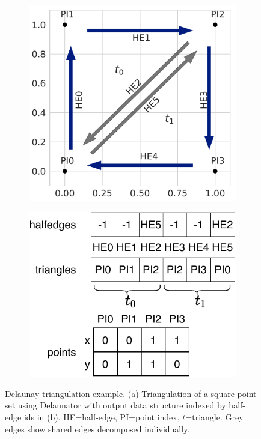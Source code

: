 \begin{figure}[ht]
    \centering
  \begin{subfigure}{.25\linewidth}
    \centering
    \includegraphics[width=0.99\linewidth]{chapter_2_polylidar/imgs/delaunator_tri-min.pdf}
    \caption{}
    \label{fig:ch2_delaunator_tri}
  \end{subfigure}
  \begin{subfigure}{.25\linewidth}
    \centering
    \includegraphics[width=.99\linewidth]{chapter_2_polylidar/imgs/DelaunatorDS.pdf}
    \caption{}
    \label{fig:ch2_delaunator_ds}
  \end{subfigure}
  \caption[Delaunay triangulation example]{Delaunay triangulation example. (a) Triangulation of a square point set using Delaunator \cite{noauthor_github_2018} with output data structure indexed by half-edge ids in (b).  HE=half-edge, PI=point index, $t$=triangle. Grey edges show shared edges decomposed individually.}
  \label{fig:ch2_delaunator} 
\end{figure}


